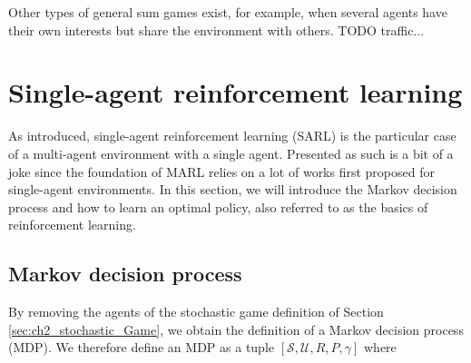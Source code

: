 Other types of general sum games exist, for example, when several agents have their own interests but share the environment with others.
TODO
traffic...


\section{Single-agent reinforcement learning} 
\label{sec:ch2_single_agent_RL}
As introduced, single-agent reinforcement learning (SARL) is the particular case of a multi-agent environment with a single agent.
Presented as such is a bit of a joke since the foundation of MARL relies on a lot of works first proposed for single-agent environments.
In this section, we will introduce the Markov decision process and how to learn an optimal policy, also referred to as the basics of reinforcement learning.

\subsection{Markov decision process} \label{sec:ch2_mdp}
By removing the agents of the stochastic game definition of Section \ref{sec:ch2_stochastic_Game}, we obtain the definition of a Markov decision process (MDP).
We therefore define an MDP as a tuple $[\mathcal{S}, \mathcal{U}, R, P, \gamma]$ where 


